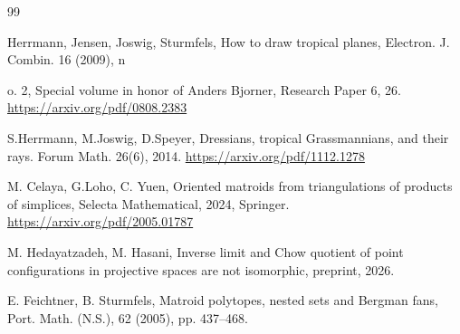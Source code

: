 \documentclass[12pt, reqno]{amsart}
\theoremstyle{definition}
\theoremstyle{remark}
\numberwithin{equation}{section}
\begin{document}
\begin{thebibliography}{99}












Herrmann, Jensen, Joswig, Sturmfels,
How to draw tropical planes, Electron. J. Combin. 16 (2009), n

o. 2,
Special volume in honor of Anders Bjorner, Research Paper 6, 26.
\url{https://arxiv.org/pdf/0808.2383}

 S.Herrmann, M.Joswig, D.Speyer, Dressians, tropical Grassmannians, and their rays. Forum Math. 26(6), 2014.
\url{https://arxiv.org/pdf/1112.1278}

 M. Celaya, G.Loho, C. Yuen, Oriented matroids from triangulations of products of simplices, Selecta Mathematical, 2024, Springer.
\url{https://arxiv.org/pdf/2005.01787}



 M. Hedayatzadeh, M. Hasani, Inverse limit and Chow quotient of point configurations in projective
spaces are not isomorphic, preprint, 2026.

 E. Feichtner, B. Sturmfels, Matroid polytopes, nested sets and Bergman
fans, Port. Math. (N.S.), 62 (2005), pp. 437–468.





%
%
%

%
%
%    
%

\end{thebibliography}
\end{document}
